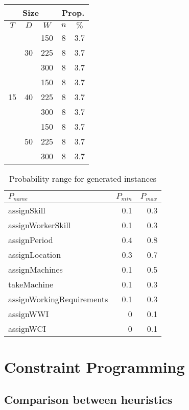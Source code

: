 \documentclass[../../thesis.tex]{subfiles}
\begin{document}
\begin{table}[H]
\begin{tabular}[t]{|c|c|c |c|c|}
    \hline
    \multicolumn{3}{|c|}{Size} & \multicolumn{2}{|c|}{Prop.} \\
    \hline 
    $T$ & $D$ & $W$ & $n$ & $\%$ \\
    \hline 
    \multirow{9}{*}{15} & \multirow{3}{*}{30} & 150 & 8 & 3.7 \\ 
    \cline{3-5}
     &  & 225 & 8 & 3.7 \\ 
     \cline{3-5}
     &  & 300 & 8 & 3.7 \\ 
     \cline{2-5}
     & \multirow{3}{*}{40} & 150 & 8 & 3.7 \\ 
     \cline{3-5}
     &  & 225 & 8 & 3.7 \\ 
     \cline{3-5}
     &  & 300 & 8 & 3.7 \\ 
     \cline{2-5}
     & \multirow{3}{*}{50} & 150 & 8 & 3.7 \\ 
     \cline{3-5}
     &  & 225 & 8 & 3.7 \\ 
     \cline{3-5}
     &  & 300 & 8 & 3.7 \\ 
    \hline
  \end{tabular}
\end{table}


\begin{table}[H]
  \caption{Probability range for generated instances}
  \label{instances:probabilities}
  \centering
  \begin{tabular}[t]{|l r r|}
    \hline 
    $P_{name}$ & $P_{min}$ & $P_{max}$ \\
    \hline
    assignSkill & 0.1 & 0.3 \\
    assignWorkerSkill & 0.1 & 0.3 \\
    assignPeriod & 0.4 & 0.8 \\
    assignLocation & 0.3 & 0.7 \\
    assignMachines & 0.1 & 0.5 \\
    takeMachine & 0.1 & 0.3 \\
    assignWorkingRequirements & 0.1 & 0.3 \\
    assignWWI & 0 & 0.1 \\
    assignWCI & 0 & 0.1 \\
    \hline
  \end{tabular}
\end{table}

\section{Constraint Programming}

\subsection{Comparison between heuristics}
\end{document}
